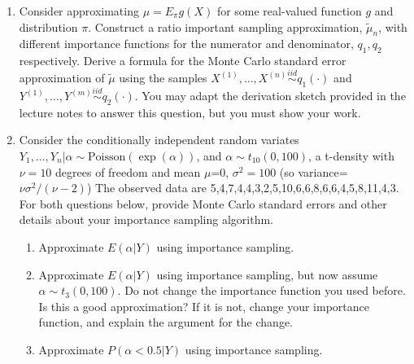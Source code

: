 \documentclass[10pt]{article}
\begin{document}
\begin{enumerate}
\item Consider approximating $\mu=E_{\pi} g(X)$ for some real-valued
  function $g$ and distribution $\pi$.  Construct a ratio important
  sampling approximation, $\tilde{\mu}_n$, with different importance
  functions for the numerator and denominator, $q_1, q_2$
  respectively. %
  Derive a formula for the Monte Carlo standard error approximation of
  $\tilde{\mu}$ using the samples
  $X^{(1)},\dots, X^{(n)} \stackrel{iid}{\sim} q_1(\cdot)$ and
  $Y^{(1)},\dots, Y^{(m)} \stackrel{iid}{\sim} q_2(\cdot)$. You may
  adapt the derivation sketch provided in the lecture notes to answer
  this question, but you must show your work.

\item Consider the conditionally independent random variates
  $Y_1,\dots,Y_n|\alpha \sim \mbox{Poisson}(\exp(\alpha))$, and
  $\alpha \sim t_{10}(0,100)$, a t-density with $\nu=10$ degrees of
  freedom and mean $\mu$=0, $\sigma^2=100$ (so
  variance=$\nu \sigma^2/(\nu-2)$) The observed data are
  5,4,7,4,4,3,2,5,10,6,6,8,6,6,4,5,8,11,4,3. For both questions below,
  provide Monte Carlo standard errors and other details about your
  importance sampling algorithm. 
\begin{enumerate}
\item Approximate $E(\alpha|Y)$ using importance sampling. 
\item Approximate $E(\alpha|Y)$ using importance sampling, but now
  assume $\alpha \sim t_3 (0,100)$. Do not change the importance
  function you used before. Is this a good approximation? If it is not,
  change your importance function, and explain the argument for the
  change. 
\item Approximate $P(\alpha<0.5|Y)$ using importance sampling. 
\end{enumerate}
\end{enumerate}
\end{document}
